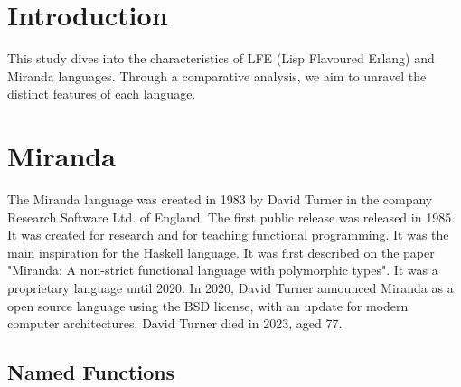 \documentclass[
	article,			%
	11pt,				%
	oneside,			%
	a4paper,			%
	english,			%
	brazil,				%
	sumario=tradicional
	]{abntex2}
\begin{document}
\frenchspacing 


%
%
\maketitle

\textual

\section*{Introduction}

This study dives into the characteristics of LFE (Lisp Flavoured Erlang) and Miranda languages. Through a comparative analysis, we aim to unravel the distinct features of each language.

\section*{Miranda}

The Miranda language was created in 1983 by David Turner in the company Research Software Ltd. of England. The first public release was released in 1985. It was created for research and for teaching functional programming. It was the main inspiration for the Haskell language. It was first described on the paper "Miranda: A non-strict functional language with polymorphic types". It was a proprietary language until 2020. In 2020, David Turner announced Miranda as a open source language using the BSD license, with an update for modern computer architectures. David Turner died in 2023, aged 77.

\subsection*{Named Functions}
\end{document}
